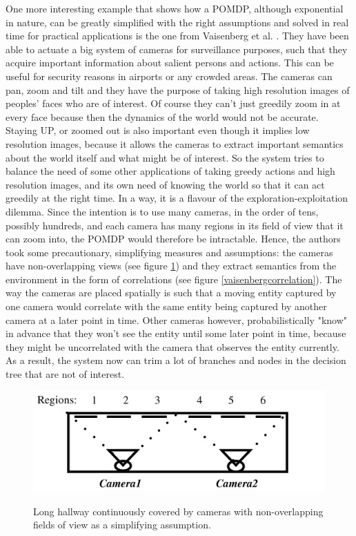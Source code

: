 \documentclass[12pt,twoside]{article}
\theoremstyle{plain}
\theoremstyle{definition}
\theoremstyle{remark}
\begin{document}
One more interesting example that shows how a POMDP, although exponential in nature, can be greatly simplified with the right assumptions and solved in real time for practical applications is the one from Vaisenberg et al. \cite{vaisenberg2014scheduling}. They have been able to actuate a big system of cameras for surveillance purposes, such that they acquire important information about salient persons and actions. This can be useful for security reasons in airports or any crowded areas. The cameras can pan, zoom and tilt and they have the purpose of taking high resolution images of peoples' faces who are of interest. Of course they can't just greedily zoom in at every face because then the dynamics of the world would not be accurate. Staying UP, or zoomed out is also important even though it implies low resolution images, because it allows the cameras to extract important semantics about the world itself and what might be of interest. So the system tries to balance the need of some other applications of taking greedy actions and high resolution images, and its own need of knowing the world so that it can act greedily at the right time. In a way, it is a flavour of the exploration-exploitation dilemma. Since the intention is to use many cameras, in the order of tens, possibly hundreds, and each camera has many regions in its field of view that it can zoom into, the POMDP would therefore be intractable. Hence, the authors took some precautionary, simplifying measures and assumptions: the cameras have non-overlapping views (see figure \ref{vaisenbergcameras}) and they extract semantics from the environment in the form of correlations (see figure \ref{vaisenbergcorrelation}). The way the cameras are placed spatially is such that a moving entity captured by one camera would correlate with the same entity being captured by another camera at a later point in time. Other cameras however, probabilistically "know" in advance that they won't see the entity until some later point in time, because they might be uncorrelated with the camera that observes the entity currently. As a result, the system now can trim a lot of branches and nodes in the decision tree that are not of interest.

\begin{figure}[H]
  \caption{
  Long hallway continuously covered by cameras with non-overlapping fields of view as a simplifying assumption.}
  \centering
    \includegraphics[scale=0.6]{vaisenbergmethod1.png}
  \label{vaisenbergcameras}
\end{figure}
\end{document}
